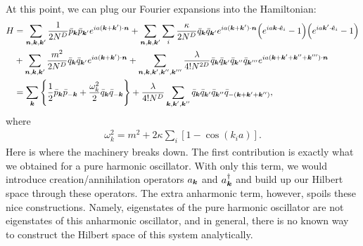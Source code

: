 {At this point, we can plug our Fourier expansions into the Hamiltonian:
\begin{align}
    H &= \sum_{\vb*{n},\vb*{k},\vb*{k}'} \frac{1}{2 N^{D}} \bar{p}_{\vb*{k}} \bar{p}_{\vb*{k}'} e^{ia(\vb*{k} + \vb*{k}') \cdot \vb*{n}} + \sum_{\vb*{n},\vb*{k},\vb*{k}'} \sum_{i} \frac{\kappa}{2 N^{D}} \bar{q}_{\vb*{k}} \bar{q}_{\vb*{k}'} e^{ia(\vb*{k} + \vb*{k}') \cdot \vb*{n}} \Big( e^{i a \vb*{k} \cdot \vu*{e}_{i}} - 1 \Big) \Big( e^{i a \vb*{k}' \cdot \vu*{e}_{i}} - 1 \Big) \nonumber \\
    &+ \sum_{\vb*{n},\vb*{k},\vb*{k}'} \frac{m^2}{2 N^{D}} \bar{q}_{\vb*{k}} \bar{q}_{\vb*{k}'} e^{ia(\vb*{k} + \vb*{k}') \cdot \vb*{n}} + \sum_{\vb*{n},\vb*{k},\vb*{k}',\vb*{k}'',\vb*{k}'''} \frac{\lambda}{4! N^{2D}} \bar{q}_{\vb*{k}} \bar{q}_{\vb*{k}'} \bar{q}_{\vb*{k}''} \bar{q}_{\vb*{k}'''} e^{ia(\vb*{k} + \vb*{k}' + \vb*{k}'' + \vb*{k}''') \cdot \vb*{n}} \nonumber \\
    &= \sum_{\vb*{k}} \Bigg\{ \frac{1}{2} \bar{p}_{\vb*{k}} \bar{p}_{-\vb*{k}} + \frac{\omega_{k}^2}{2} \bar{q}_{\vb*{k}} \bar{q}_{-\vb*{k}} \Bigg\} + \frac{\lambda}{4! N^{D}} \sum_{\vb*{k},\vb*{k}',\vb*{k}''} \bar{q}_{\vb*{k}} \bar{q}_{\vb*{k}'} \bar{q}_{\vb*{k}''} \bar{q}_{-(\vb*{k} + \vb*{k}' + \vb*{k}'')}
,\end{align}
where
\begin{align}
    \omega_{k}^2 = m^2 + 2 \kappa \sum_{i} [1 - \cos(k_{i} a)]
.\end{align}
Here is where the machinery breaks down.
The first contribution is exactly what we obtained for a pure harmonic oscillator.
With only this term, we would introduce creation/annihilation operators $a_{\vb*{k}}$ and $a_{\vb*{k}}^{\dagger}$ and build up our Hilbert space through these operators.
The extra anharmonic term, however, spoils these nice constructions.
Namely, eigenstates of the pure harmonic oscillator are not eigenstates of this anharmonic oscillator, and in general, there is no known way to construct the Hilbert space of this system analytically.

}
